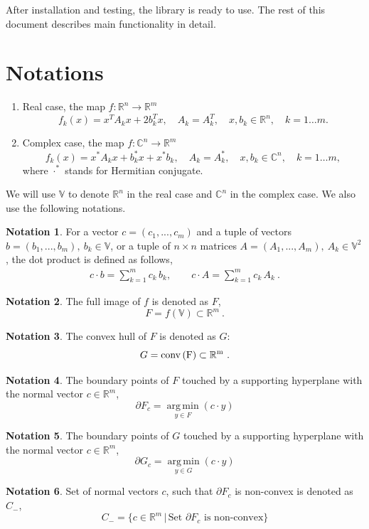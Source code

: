 \documentclass[a4paper]{article}
\DeclareMathOperator*{\argmin}{arg\,min}
\newcommand{\R}{\mathbb{R}}
\newcommand{\conv}{\rm{conv}\,}
\theoremstyle{definition}
\newtheorem{definition}{Notation}[]
\begin{document}
After installation and testing, the library is ready to use. The rest of this document describes main functionality in detail.

\newpage

\section*{Notations}
\begin{enumerate}
\item Real case, the map $f\colon \mathbb{R}^n\to\mathbb{R}^m$
\begin{equation}
f_k(x)=x^TA_k x+2b_k^Tx ,\quad A_k=A_k^T ,\quad x, b_k\in \mathbb{R}^n ,\quad k=1\dots m . \label{real}
\end{equation}
\item Complex case, the map $f\colon \mathbb{C}^n\to\mathbb{R}^m$
\begin{equation}
f_k(x)=x^*A_k x+b_k^*x+x^*b_k ,\quad A_k=A_k^* ,\quad x, b_k\in \mathbb{C}^n ,\quad k=1\dots m ,\label{complex}
\end{equation}
where $\cdot^*$ stands for Hermitian conjugate.
\end{enumerate}

We will use $\mathbb{V}$ to denote $\mathbb{R}^n$ in the real case and $\mathbb{C}^n$ in the  complex case.
We also use the following notations.\\

\theoremstyle{definition}
\begin{definition}
For a vector $c=(c_1,...,c_m)$ and a tuple of vectors $b=(b_1,...,b_m), \ b_k \in \mathbb{V}$, or a tuple of $n\times n$ matrices $A=(A_1,...,A_m), \  A_k\in \mathbb{V}^2$, the dot product is defined as follows,
\begin{eqnarray}
c\cdot b=\sum\limits_{k=1}^m c_k\, b_k ,\qquad
c\cdot A=\sum\limits_{k=1}^m c_k\, A_k\ . \nonumber
\end{eqnarray}
\end{definition}

\begin{definition}
The full image of $f$ is denoted as $F$,
	$$F=f(\mathbb{V})\subset \mathbb{R}^m\ .$$
\end{definition}
\begin{definition} The convex hull of $F$ is denoted as $G$:
	$$G=\conv (F)\subset \mathbb{R}^m\ .$$
\end{definition}
\begin{definition} The boundary points of $F$ touched by a supporting hyperplane with the normal vector $c\in\mathbb{R}^m$,
	$$\partial F_c=\argmin\limits_{y\in F}(c\cdot y)$$
\end{definition}
\begin{definition} The boundary points of $G$ touched by a supporting hyperplane with the normal vector $c\in\mathbb{R}^m$,
	$$\partial G_c=\argmin\limits_{y\in G}(c\cdot y)$$
\end{definition}
\begin{definition}\label{ex:c_minus}
	Set of normal vectors $c$, such that $\partial F_c$ is non-convex is denoted as $C_-$,
	$$C_-=\{c\in\R^m\,\big|\,\mbox{Set }\partial F_c\mbox{ is non-convex}\}$$
\end{definition}
\end{document}
